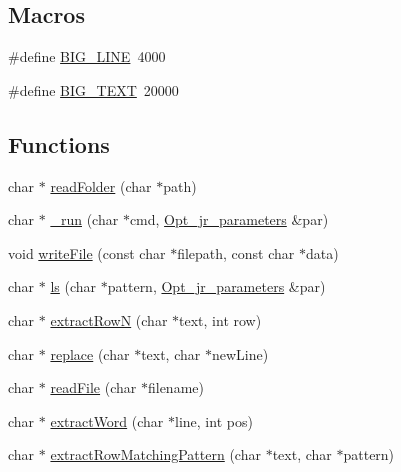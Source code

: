 \subsection*{Macros}
\begin{DoxyCompactItemize}
\item 
\#define \hyperlink{invoke__predictor__helper_8hh_adf5fb2a227e3abadea9424e33cc02705}{B\-I\-G\-\_\-\-L\-I\-N\-E}~4000
\item 
\#define \hyperlink{invoke__predictor__helper_8hh_af5bc9b073dea33e26386656ad6be5ef7}{B\-I\-G\-\_\-\-T\-E\-X\-T}~20000
\end{DoxyCompactItemize}
\subsection*{Functions}
\begin{DoxyCompactItemize}
\item 
char $\ast$ \hyperlink{invoke__predictor__helper_8hh_a28d1d79b02f44f349115bf4c9e754770}{read\-Folder} (char $\ast$path)
\item 
char $\ast$ \hyperlink{invoke__predictor__helper_8hh_adf7027b4f2f1de8770f5bee085e8db7c}{\-\_\-run} (char $\ast$cmd, \hyperlink{classOpt__jr__parameters}{Opt\-\_\-jr\-\_\-parameters} \&par)
\item 
void \hyperlink{invoke__predictor__helper_8hh_a7eb7b34e9ea84bfbed4afbf5f63dd024}{write\-File} (const char $\ast$filepath, const char $\ast$data)
\item 
char $\ast$ \hyperlink{invoke__predictor__helper_8hh_a80d09552b3ce875c810f74a5300dee30}{ls} (char $\ast$pattern, \hyperlink{classOpt__jr__parameters}{Opt\-\_\-jr\-\_\-parameters} \&par)
\item 
char $\ast$ \hyperlink{invoke__predictor__helper_8hh_af8e06c5020e70e2f740101fc7bed6fea}{extract\-Row\-N} (char $\ast$text, int row)
\item 
char $\ast$ \hyperlink{invoke__predictor__helper_8hh_a66e21ca5b85d790af9025eb13f4beca5}{replace} (char $\ast$text, char $\ast$new\-Line)
\item 
char $\ast$ \hyperlink{invoke__predictor__helper_8hh_aec83b878d49ef5976f2175867cdc2d82}{read\-File} (char $\ast$filename)
\item 
char $\ast$ \hyperlink{invoke__predictor__helper_8hh_af6244416f7b414764278d2f5cdfe262c}{extract\-Word} (char $\ast$line, int pos)
\item 
char $\ast$ \hyperlink{invoke__predictor__helper_8hh_abf4e66cc6aa015a35688c049d4f72ade}{extract\-Row\-Matching\-Pattern} (char $\ast$text, char $\ast$pattern)
\end{DoxyCompactItemize}


